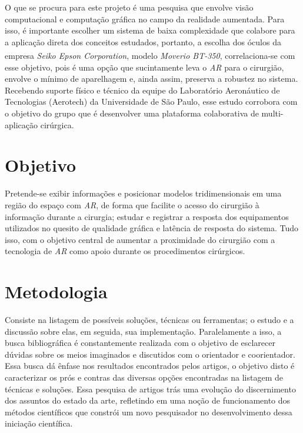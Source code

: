 O que se procura para este projeto é uma pesquisa que envolve visão computacional e computação gráfica no campo da realidade aumentada. Para isso, é importante escolher um sistema de baixa complexidade que colabore para a aplicação direta dos conceitos estudados, portanto, a escolha dos óculos da empresa \textit{Seiko Epson Corporation\textsuperscript{\textregistered}}, modelo \textit{Moverio BT-350\texttrademark}, correlaciona-se com esse objetivo, pois é uma opção que sucintamente leva o \textit{AR} para o cirurgião, envolve o mínimo de aparelhagem e, ainda assim, preserva a robustez no sistema. Recebendo suporte físico e técnico da equipe do Laboratório Aeronáutico de Tecnologias (Aerotech) da Universidade de São Paulo, esse estudo corrobora com o objetivo do grupo que é desenvolver uma plataforma colaborativa de multi-aplicação cirúrgica. 

\section{Objetivo}

Pretende-se exibir informações e posicionar modelos tridimensionais em uma região do espaço com \textit{AR}, de forma que facilite o acesso do cirurgião à informação durante a cirurgia; estudar e registrar a resposta dos equipamentos utilizados no quesito de qualidade gráfica e latência de resposta do sistema. Tudo isso, com o objetivo central de aumentar a proximidade do cirurgião com a tecnologia de \textit{AR} como apoio durante os procedimentos cirúrgicos.

\section{Metodologia}

Consiste na listagem de possíveis soluções, técnicas ou ferramentas; o estudo e a discussão sobre elas, em seguida, sua implementação. Paralelamente a isso, a busca bibliográfica é constantemente realizada com o objetivo de esclarecer dúvidas sobre os meios imaginados e discutidos com o orientador e coorientador. Essa busca dá ênfase nos resultados encontrados pelos artigos, o objetivo disto é caracterizar os prós e contras das diversas opções encontradas na listagem de técnicas e soluções. Essa pesquisa de artigos trás uma evolução do discernimento dos assuntos do estado da arte, refletindo em uma noção de funcionamento dos métodos científicos que constrói um novo pesquisador no desenvolvimento dessa iniciação científica.

